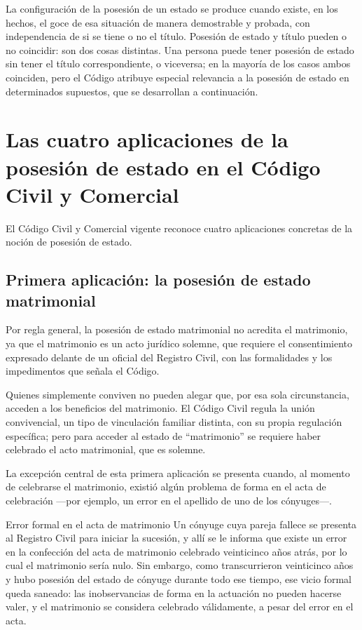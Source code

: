 \documentclass[12pt,oneside]{book}
\begin{document}
La configuración de la posesión de un estado se produce cuando existe, en los hechos, el goce de esa situación de manera demostrable y probada, con independencia de si se tiene o no el título. Posesión de estado y título pueden o no coincidir: son dos cosas distintas. Una persona puede tener posesión de estado sin tener el título correspondiente, o viceversa; en la mayoría de los casos ambos coinciden, pero el Código atribuye especial relevancia a la posesión de estado en determinados supuestos, que se desarrollan a continuación.

\section{Las cuatro aplicaciones de la posesión de estado en el Código Civil y Comercial}

El Código Civil y Comercial vigente reconoce cuatro aplicaciones concretas de la noción de posesión de estado.

\subsection{Primera aplicación: la posesión de estado matrimonial}

Por regla general, la posesión de estado matrimonial no acredita el matrimonio, ya que el matrimonio es un acto jurídico solemne, que requiere el consentimiento expresado delante de un oficial del Registro Civil, con las formalidades y los impedimentos que señala el Código.

\begin{important}
Quienes simplemente conviven no pueden alegar que, por esa sola circunstancia, acceden a los beneficios del matrimonio. El Código Civil regula la unión convivencial, un tipo de vinculación familiar distinta, con su propia regulación específica; pero para acceder al estado de ``matrimonio'' se requiere haber celebrado el acto matrimonial, que es solemne.
\end{important}

La excepción central de esta primera aplicación se presenta cuando, al momento de celebrarse el matrimonio, existió algún problema de forma en el acta de celebración —por ejemplo, un error en el apellido de uno de los cónyuges—.

\begin{example}{Error formal en el acta de matrimonio}
Un cónyuge cuya pareja fallece se presenta al Registro Civil para iniciar la sucesión, y allí se le informa que existe un error en la confección del acta de matrimonio celebrado veinticinco años atrás, por lo cual el matrimonio sería nulo. Sin embargo, como transcurrieron veinticinco años y hubo posesión del estado de cónyuge durante todo ese tiempo, ese vicio formal queda saneado: las inobservancias de forma en la actuación no pueden hacerse valer, y el matrimonio se considera celebrado válidamente, a pesar del error en el acta.
\end{example}
\end{document}
